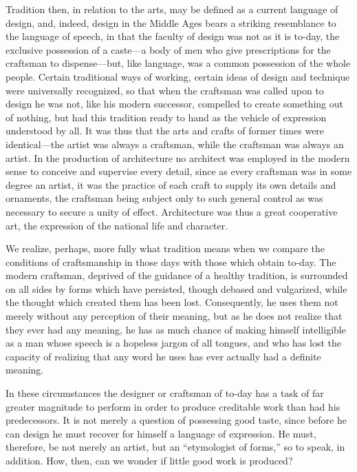 \documentclass{book}
\begin{document}
Tradition then, in relation to the arts, may be defined as a current language of design, and, indeed, design in the Middle Ages bears a striking resemblance to the language of speech, in that the faculty of design was not as it is to-day, the exclusive possession of a caste—a body of men who give prescriptions for the craftsman to dispense—but, like language, was a common possession of the whole people. Certain traditional ways of working, certain ideas of design and technique were universally recognized, so that when the craftsman was called upon to design he was not, like his modern successor, compelled to create something out of nothing, but had this tradition ready to hand as the vehicle of expression understood by all. It was thus that the arts and crafts of former times were identical—the artist was always a craftsman, while the craftsman was always an artist. In the production of architecture no architect was employed in the modern sense to conceive and supervise every detail, since as every craftsman was in some degree an artist, it was the practice of each craft to supply its own details and ornaments, the craftsman being subject only to such general control as was necessary to secure a unity of effect. Architecture was thus a great cooperative art, the expression of the national life and character.

We realize, perhaps, more fully what tradition means when we compare the conditions of craftsmanship in those days with those which obtain to-day. The modern craftsman, deprived of the guidance of a healthy tradition, is surrounded on all sides by forms which have persisted, though debased and vulgarized, while the thought which created them has been lost. Consequently, he uses them not merely without any perception of their meaning, but as he does not realize that they ever had any meaning, he has as much chance of making himself intelligible as a man whose speech is a hopeless jargon of all tongues, and who has lost the capacity of realizing that any word he uses has ever actually had a definite meaning.

In these circumstances the designer or craftsman of to-day has a task of far greater magnitude to perform in order to produce creditable work than had his predecessors. It is not merely a question of possessing good taste, since before he can design he must recover for himself a language of expression. He must, therefore, be not merely an artist, but an “etymologist of forms,” so to speak, in addition. How, then, can we wonder if little good work is produced?
\end{document}
